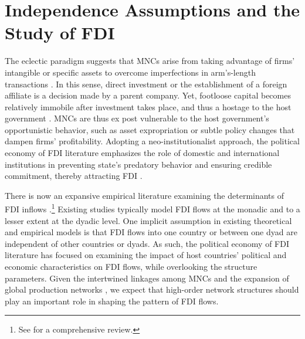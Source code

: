 \documentclass[reqno,onecolumn,letterpaper,12pt]{article}
\begin{document}



\section{Independence Assumptions and the Study of FDI}

The eclectic paradigm suggests that MNCs arise from taking advantage of firms' intangible or specific assets to overcome imperfections in arm's-length transactions \citep{Dunning:1988,Dunning:1992}. In this sense, direct investment or the establishment of a foreign affiliate is a decision made by a parent company. Yet, footloose capital becomes relatively immobile after investment takes place, and thus a hostage to the host government \citep{Vernon:1971,Vernon:1980}. MNCs are thus ex post vulnerable to the host government's opportunistic behavior, such as asset expropriation or subtle policy changes that dampen firms' profitability. Adopting a neo-institutionalist approach, the political economy of FDI literature emphasizes the role of domestic and international institutions in preventing state's predatory behavior and ensuring credible commitment, thereby attracting FDI \citep[e.g.][]{Henisz:2000,Jensen:2003,Jensen:2006,Li_Resnick:2003,Staats_Biglaiser:2012,Buthe_Milner:2008,Allee_Peinhardt:2011,Kerner:2009}.

There is now an expansive empirical literature examining the determinants of FDI inflows \citep[e.g.,][]{Noorbakhsh_et_al:2001,Yeaple:2003,Jensen:2003,Li_Resnick:2003,Buthe_Milner:2008,Li_Vashchilko:2010,Kerner:2009,Wright_Zhu:2017}.\footnote{See \citet{Pandya:2016} for a comprehensive review.} Existing studies typically model FDI flows at the monadic and to a lesser extent at the dyadic level. One implicit assumption in existing theoretical and empirical models is that FDI flows into one country or between one dyad are independent of other countries or dyads. As such, the political economy of FDI literature has focused on examining the impact of host countries' political and   economic characteristics on FDI flows, while overlooking the structure parameters. Given the intertwined linkages among MNCs and the expansion of global production networks \citep{UNCTAD:2013}, we expect that high-order network structures should play an important role in shaping the pattern of FDI flows.
\end{document}
